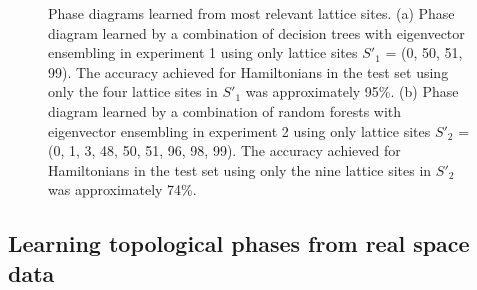 \documentclass[fleqn,10pt]{wlscirep}
\begin{document}
\begin{figure}
\centering
{}
\caption{Phase diagrams learned from most relevant lattice sites. (a) Phase diagram learned by a combination of decision trees with eigenvector ensembling in experiment 1 using only lattice sites $S'_1$ = (0, 50, 51, 99). The accuracy achieved for Hamiltonians in the test set using only the four lattice sites in $S'_1$ was approximately 95\%.  (b) Phase diagram learned by a combination of random forests with eigenvector ensembling in experiment 2 using only lattice sites $S'_2$ = (0, 1, 3, 48, 50, 51, 96, 98, 99). The accuracy achieved for Hamiltonians in the test set using only the nine lattice sites in $S'_2$ was approximately 74\%.}
\label{less_feat}
\end{figure}

\subsection*{Learning topological phases from real space data}
\end{document}
